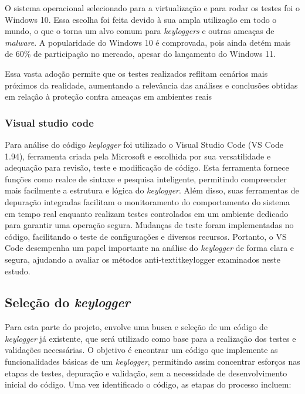 \documentclass[12pt]{article}
\begin{document}
O sistema operacional selecionado para a virtualização e para rodar os testes foi o Windows 10. Essa escolha foi feita devido à sua ampla utilização em todo o mundo, o que o torna um alvo comum para \textit{keyloggers} e outras ameaças de \textit{malware}. A popularidade do Windows 10 é comprovada, pois ainda detém mais de 60\% de participação no mercado, apesar do lançamento do Windows 11. \citep{tomshardware2023}

Essa vasta adoção permite que os testes realizados reflitam cenários mais próximos da realidade, aumentando a relevância das análises e conclusões obtidas em relação à proteção contra ameaças em ambientes reais

\subsubsection{Visual studio code}
Para análise do código \textit{keylogger} foi utilizado o Visual Studio Code (VS Code 1.94), ferramenta criada pela Microsoft e escolhida por sua versatilidade e adequação para revisão, teste e modificação de código. Esta ferramenta fornece funções como realce de sintaxe e pesquisa inteligente, permitindo compreender mais facilmente a estrutura e lógica do \textit{keylogger}. Além disso, suas ferramentas de depuração integradas facilitam o monitoramento do comportamento do sistema em tempo real enquanto realizam testes controlados em um ambiente dedicado para garantir uma operação segura. Mudanças de teste foram implementadas no código, facilitando o teste de configurações e diversos recursos. Portanto, o VS Code desempenha um papel importante na análise do \textit{keylogger} de forma clara e segura, ajudando a avaliar os métodos anti-textit{keylogger} examinados neste estudo.

\subsection{Seleção do \textit{keylogger}}
Para esta parte do projeto, envolve uma busca e seleção de um código de \textit{keylogger} já existente, que será utilizado como base para a realização dos testes e validações necessárias. O objetivo é encontrar um código que implemente as funcionalidades básicas de um \textit{keylogger}, permitindo assim concentrar esforços nas etapas de testes, depuração e validação, sem a necessidade de desenvolvimento inicial do código. Uma vez identificado o código, as etapas do processo incluem:
\end{document}
